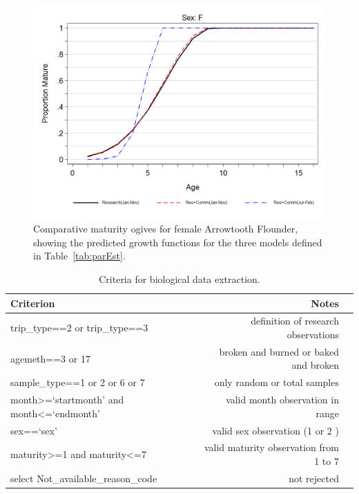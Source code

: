\begin{figure}[htp]
\captionsetup[subfigure]{labelformat=empty}
\begin{center}
\includegraphics[bb=0 0 925 600,width=6in,keepaspectratio=true]{appD-Biology/maturityOgiveCompare.png}
\end{center}
\caption{Comparative maturity ogives for female Arrowtooth Flounder, showing the predicted growth functions for the three models defined in Table~\ref{tab:parEst}.}
\label{fig:maturityOgiveCompare}
\end{figure}

\clearpage


\begin{table}[b]
\centering
\caption{\label{tab:bioCrit} Criteria for biological data extraction.}
\begin{tabular}{lrr}
\hline
Criterion & Notes \\
\hline
trip\_type==2 or trip\_type==3                               & definition of research observations \\
agemeth==3 or 17                                             & broken and burned or baked and broken \\
sample\_type==1 or 2 or 6 or 7                               & only random or total samples \\
month\textgreater=`startmonth' and month\textless=`endmonth' & valid month observation in range \\
sex==`sex'	                                                 & valid sex observation (1 or 2 ) \\
maturity\textgreater=1 and maturity\textless=7	             & valid maturity observation from 1 to 7 \\
select Not\_available\_reason\_code                          & not rejected \\
\hline
\end{tabular}
\end{table}

